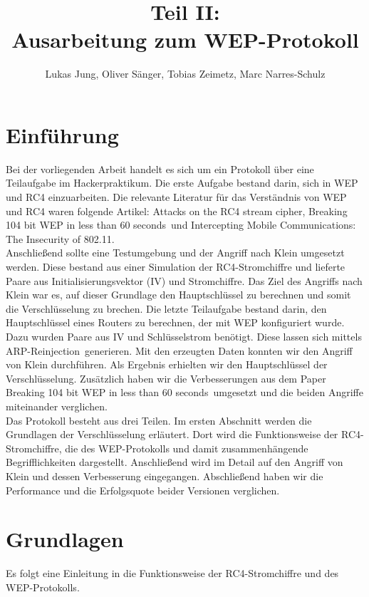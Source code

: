 \documentclass[10pt,a4paper]{article}
\title{Teil II:\\Ausarbeitung zum WEP-Protokoll}
\author{Lukas Jung, Oliver Sänger, Tobias Zeimetz, Marc Narres-Schulz}
\begin{document}
\maketitle
\tableofcontents
\newpage

\section{Einführung}
Bei der vorliegenden Arbeit handelt es sich um ein Protokoll über eine Teilaufgabe im \glqq Hackerpraktikum\grqq . Die erste Aufgabe bestand darin, sich in WEP und RC4 einzuarbeiten. Die relevante Literatur für das Verständnis von WEP und RC4 waren folgende Artikel: \glqq Attacks on the RC4 stream cipher\grqq \cite{Kle08}, \glqq Breaking 104 bit WEP in less than 60 seconds\grqq \cite{TWP07}\ und \glqq Intercepting Mobile Communications: The Insecurity of 802.11\grqq \cite{BGW01}.\\
Anschließend sollte eine Testumgebung und der Angriff nach Klein umgesetzt werden. Diese bestand aus einer Simulation der RC4-Stromchiffre und lieferte  Paare aus Initialisierungsvektor (IV) und Stromchiffre. Das Ziel des Angriffs nach Klein war es, auf dieser Grundlage den Hauptschlüssel zu berechnen und somit die Verschlüsselung zu brechen.
Die letzte Teilaufgabe bestand darin, den Hauptschlüssel eines Routers zu berechnen, der mit WEP konfiguriert wurde. Dazu wurden Paare aus IV und Schlüsselstrom benötigt. Diese lassen sich mittels \glqq ARP-Reinjection\grqq\ generieren. Mit den erzeugten Daten konnten wir den Angriff von Klein durchführen. Als Ergebnis erhielten wir den Hauptschlüssel der Verschlüsselung. Zusätzlich haben wir die Verbesserungen aus dem Paper \glqq Breaking 104 bit WEP in less than 60 seconds\grqq \cite{TWP07}\ umgesetzt und die beiden Angriffe miteinander verglichen.\\
Das Protokoll besteht aus drei Teilen. Im ersten Abschnitt werden die Grundlagen der Verschlüsselung erläutert. Dort wird die Funktionsweise der RC4-Stromchiffre, die des WEP-Protokolls und damit zusammenhängende Begrifflichkeiten dargestellt. Anschließend wird im Detail auf den Angriff von Klein und dessen Verbesserung eingegangen. Abschließend haben wir die Performance und die Erfolgsquote beider Versionen verglichen. 
\section{Grundlagen}
Es folgt eine Einleitung in die Funktionsweise der RC4-Stromchiffre und des WEP-Protokolls.
\end{document}
